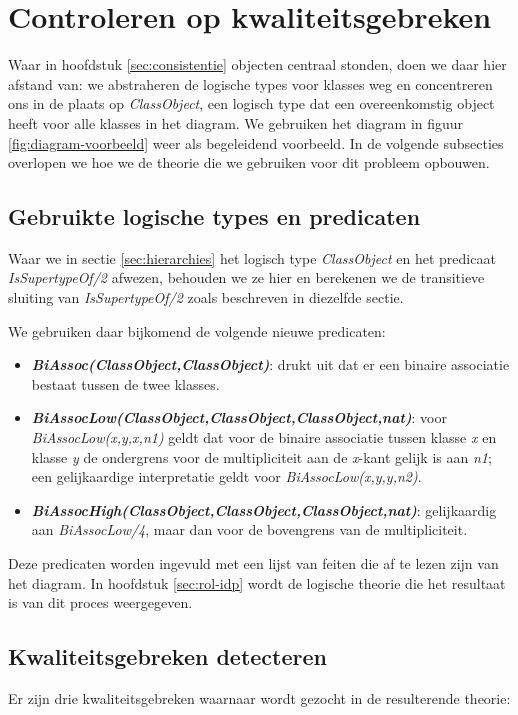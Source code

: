 \chapter{Controleren op kwaliteitsgebreken}\label{sec:kwaliteitsgebrek}
Waar in hoofdstuk \ref{sec:consistentie} objecten centraal stonden, doen we daar hier afstand van: we abstraheren de logische types voor klasses weg en concentreren ons in de plaats op \textit{ClassObject}, een logisch type dat een overeenkomstig object heeft voor alle klasses in het diagram. We gebruiken het diagram in figuur \ref{fig:diagram-voorbeeld} weer als begeleidend voorbeeld. In de volgende subsecties overlopen we hoe we de theorie die we gebruiken voor dit probleem opbouwen.

\section{Gebruikte logische types en predicaten}
Waar we in sectie \ref{sec:hierarchies} het logisch type \textit{ClassObject} en het predicaat \textit{IsSupertypeOf/2} afwezen, behouden we ze hier en berekenen we de transitieve sluiting van \textit{IsSupertypeOf/2} zoals beschreven in diezelfde sectie.

We gebruiken daar bijkomend de volgende nieuwe predicaten:

\begin{itemize}
	\item \textbf{\textit{BiAssoc(ClassObject,ClassObject)}}: drukt uit dat er een binaire associatie bestaat tussen de twee klasses.
	\item \textbf{\textit{BiAssocLow(ClassObject,ClassObject,ClassObject,nat)}}: voor \textit{BiAssocLow(x,y,x,n1)} geldt dat voor de binaire associatie tussen klasse \textit{x} en klasse \textit{y} de ondergrens voor de multipliciteit aan de \textit{x}-kant gelijk is aan \textit{n1}; een gelijkaardige interpretatie geldt voor \textit{BiAssocLow(x,y,y,n2)}.
	\item \textbf{\textit{BiAssocHigh(ClassObject,ClassObject,ClassObject,nat)}}: gelijkaardig aan \textit{BiAssocLow/4}, maar dan voor de bovengrens van de multipliciteit.
\end{itemize}

Deze predicaten worden ingevuld met een lijst van feiten die af te lezen zijn van het diagram. In hoofdstuk \ref{sec:rol-idp} wordt de logische theorie die het resultaat is van dit proces weergegeven.

\section{Kwaliteitsgebreken detecteren}
Er zijn drie kwaliteitsgebreken waarnaar wordt gezocht in de resulterende theorie:

